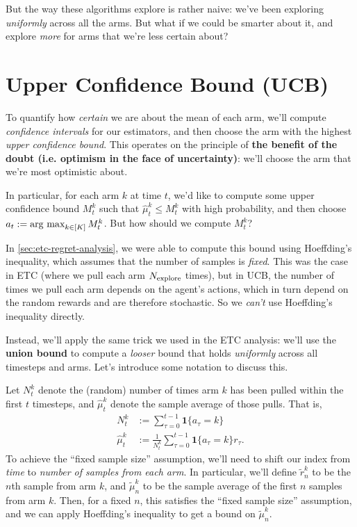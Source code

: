 \documentclass[\main/main]{subfiles}
\begin{document}
But the way these algorithms explore is rather naive: we've been exploring \emph{uniformly} across all the arms. But what if we could be smarter about it, and explore \emph{more} for arms that we're less certain about?


\section{Upper Confidence Bound (UCB)}

To quantify how \emph{certain} we are about the mean of each arm, we'll compute \emph{confidence intervals} for our estimators, and then choose the arm with the highest \emph{upper confidence bound}. This operates on the principle of \textbf{the benefit of the doubt (i.e. optimism in the face of uncertainty)}: we'll choose the arm that we're most optimistic about.

In particular, for each arm $k$ at time $t$, we'd like to compute some upper confidence bound $M^k_t$ such that $\hat \mu^k_t \le M^k_t$ with high probability, and then choose $a_t := \operatorname*{\textrm{arg\ max}}_{k \in [K]} M^k_t$. But how should we compute $M^k_t$?

In \autoref{sec:etc-regret-analysis}, we were able to compute this bound using Hoeffding's inequality, which assumes that the number of samples is \emph{fixed}. This was the case in ETC (where we pull each arm $N_{\text{explore}}$ times), but in UCB, the number of times we pull each arm depends on the agent's actions, which in turn depend on the random rewards and are therefore stochastic. So we \emph{can't} use Hoeffding's inequality directly.

Instead, we'll apply the same trick we used in the ETC analysis: we'll use the \textbf{union bound} to compute a \emph{looser} bound that holds \emph{uniformly} across all timesteps and arms. Let's introduce some notation to discuss this.

Let $N^k_t$ denote the (random) number of times arm $k$ has been pulled within the first $t$ timesteps, and $\hat \mu^k_t$ denote the sample average of those pulls. That is,
\begin{align*}
    N^k_t        & := \sum_{\tau=0}^{t-1} \mathbf{1} \{ a_\tau = k \}                         \\
    \hat \mu^k_t & := \frac{1}{N^k_t} \sum_{\tau=0}^{t-1} \mathbf{1} \{ a_\tau = k \} r_\tau.
\end{align*}
To achieve the ``fixed sample size'' assumption, we'll need to shift our index from \emph{time} to \emph{number of samples from each arm}. In particular, we'll define $\tilde r^k_n$ to be the $n$th sample from arm $k$, and $\tilde \mu^k_n$ to be the sample average of the first $n$ samples from arm $k$. Then, for a fixed $n$, this satisfies the ``fixed sample size'' assumption, and we can apply Hoeffding's inequality to get a bound on $\tilde \mu^k_n$.
\end{document}
